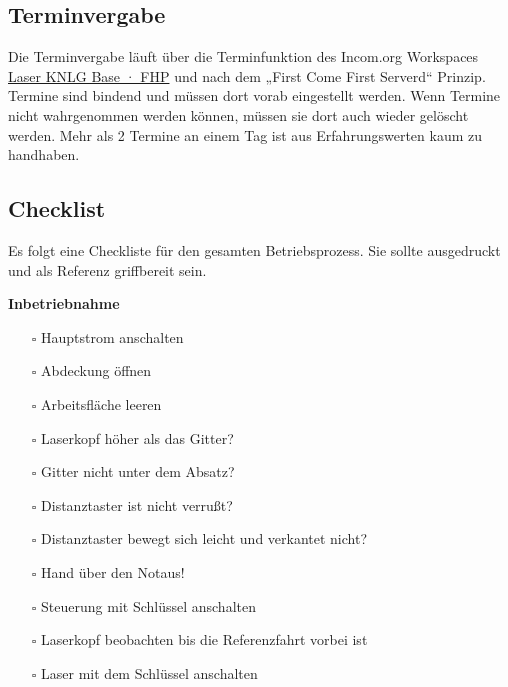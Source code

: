 \documentclass[]{article}
\providecommand{\tightlist}{%
  \setlength{\itemsep}{0pt}\setlength{\parskip}{0pt}}
\begin{document}
\hypertarget{terminvergabe}{%
\subsection{Terminvergabe}\label{terminvergabe}}

Die Terminvergabe läuft über die Terminfunktion des Incom.org Workspaces
\href{https://fhp.incom.community/workspace/6508}{Laser KNLG Base · FHP}
und nach dem „First Come First Serverd`` Prinzip. Termine sind bindend
und müssen dort vorab eingestellt werden. Wenn Termine nicht
wahrgenommen werden können, müssen sie dort auch wieder gelöscht werden.
Mehr als 2 Termine an einem Tag ist aus Erfahrungswerten kaum zu
handhaben.

\hypertarget{checklist}{%
\subsection{Checklist}\label{checklist}}

Es folgt eine Checkliste für den gesamten Betriebsprozess. Sie sollte
ausgedruckt und als Referenz griffbereit sein.

\textbf{Inbetriebnahme}

\begin{itemize}
\tightlist
\item[$\square$]
  Hauptstrom anschalten
\item[$\square$]
  Abdeckung öffnen\\
\item[$\square$]
  Arbeitsfläche leeren\\
\item[$\square$]
  Laserkopf höher als das Gitter?\\
\item[$\square$]
  Gitter nicht unter dem Absatz?\\
\item[$\square$]
  Distanztaster ist nicht verrußt?\\
\item[$\square$]
  Distanztaster bewegt sich leicht und verkantet nicht?\\
\item[$\square$]
  Hand über den Notaus!\\
\item[$\square$]
  Steuerung mit Schlüssel anschalten\\
\item[$\square$]
  Laserkopf beobachten bis die Referenzfahrt vorbei ist\\
\item[$\square$]
  Laser mit dem Schlüssel anschalten
\end{itemize}
\end{document}
